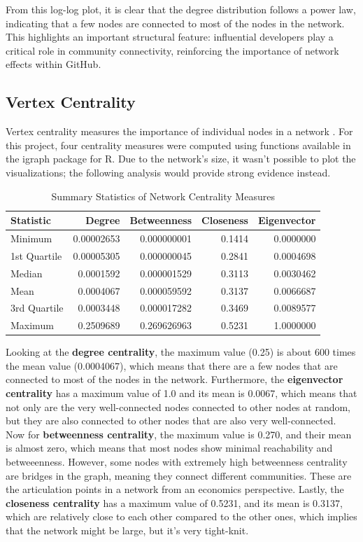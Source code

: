 \documentclass[letterpaper]{article}
\begin{document}
From this log-log plot, it is clear that the degree distribution follows a power law, indicating that a few nodes are connected to most of the nodes in the network. This highlights an important structural feature: influential developers play a critical role in community connectivity, reinforcing the importance of network effects within GitHub.

\subsection{Vertex Centrality}
Vertex centrality measures the importance of individual nodes in a network \cite{freeman1978centrality}. For this project, four centrality measures were computed using functions available in the igraph package for R. Due to the network's size, it wasn't possible to plot the visualizations; the following analysis would provide strong evidence instead.

\begin{table}[H]
  \centering
  \caption{Summary Statistics of Network Centrality Measures}
  \begin{tabular}{l|rrrr}
    \hline
    Statistic & Degree & Betweenness & Closeness & Eigenvector \\
    \hline
    Minimum      & 0.00002653 & 0.000000001 & 0.1414 & 0.0000000 \\
    1st Quartile & 0.00005305 & 0.000000045 & 0.2841 & 0.0004698 \\
    Median       & 0.0001592  & 0.000001529 & 0.3113 & 0.0030462 \\
    Mean         & 0.0004067  & 0.000059592 & 0.3137 & 0.0066687 \\
    3rd Quartile & 0.0003448  & 0.000017282 & 0.3469 & 0.0089577 \\
    Maximum      & 0.2509689  & 0.269626963 & 0.5231 & 1.0000000 \\
    \hline
  \end{tabular}
\end{table}

Looking at the \textbf{degree centrality}, the maximum value (0.25) is about 600 times the mean value (0.0004067), which means that there are a few nodes that are connected to most of the nodes in the network. Furthermore, the \textbf{eigenvector centrality} has a maximum value of 1.0 and its mean is 0.0067, which means that not only are the very well-connected nodes connected to other nodes at random, but they are also connected to other nodes that are also very well-connected. Now for \textbf{betweenness centrality}, the maximum value is 0.270, and their mean is almost zero, which means that most nodes show minimal reachability and betweeenness. However, some nodes with extremely high betweenness centrality are bridges in the graph, meaning they connect different communities. These are the articulation points in a network from an economics perspective. Lastly, the \textbf{closeness centrality} has a maximum value of 0.5231, and its mean is 0.3137, which are relatively close to each other compared to the other ones, which implies that the network might be large, but it's very tight-knit.
\end{document}
